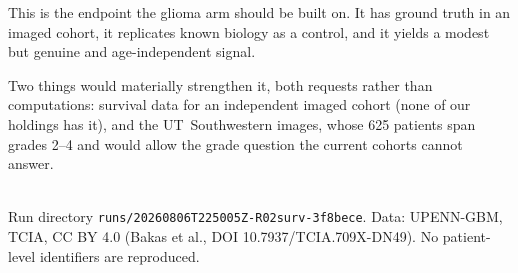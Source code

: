 \documentclass[11pt,a4paper]{article}
\begin{document}
This is the endpoint the glioma arm should be built on. It has ground truth in an imaged
cohort, it replicates known biology as a control, and it yields a modest but genuine and
age-independent signal.

Two things would materially strengthen it, both requests rather than computations:
survival data for an independent imaged cohort (none of our holdings has it), and the
UT~Southwestern images, whose 625 patients span grades 2--4 and would allow the grade
question the current cohorts cannot answer.

\vfill
\noindent{\color{qgrey}\rule{\textwidth}{0.4pt}}\\
{\footnotesize\color{qgrey}Run directory
\texttt{runs/20260806T225005Z-R02surv-3f8bece}. Data: UPENN-GBM, TCIA, CC BY 4.0
(Bakas et al., DOI 10.7937/TCIA.709X-DN49). No patient-level identifiers are reproduced.}
\end{document}
